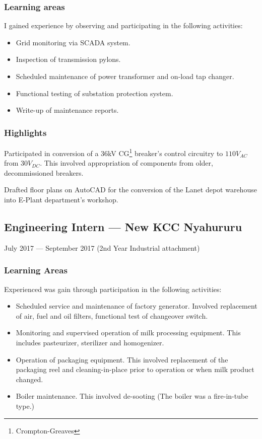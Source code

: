 \documentclass[a4paper]{article}
\begin{document}
\subsubsection{Learning areas}
I gained experience by observing and participating in the following activities:
\begin{itemize}
	\item Grid monitoring via SCADA system.
	\item Inspection of transmission pylons.
	\item Scheduled maintenance of power transformer and on-load tap changer.
	\item Functional testing of substation protection system.
	\item Write-up of maintenance reports.
\end{itemize}
\subsubsection{Highlights}
Participated in conversion of a 36kV CG\footnote{Crompton-Greaves} breaker's control circuitry to $110V_{AC}$ from $30V_{DC}$. This involved appropriation of components from older, decommissioned breakers.

Drafted floor plans on AutoCAD for the conversion of the Lanet depot warehouse into E-Plant department's workshop.

\subsection{Engineering Intern --- New KCC Nyahururu}
July 2017 --- September 2017 (2nd Year Industrial attachment)
\subsubsection{Learning Areas}
Experienced was gain through participation in the following activities:
\begin{itemize}
	\item Scheduled service and maintenance of factory generator. Involved replacement of air, fuel and oil filters, functional test of changeover switch.
	\item Monitoring and supervised operation of milk processing equipment. This includes pasteurizer, sterilizer and homogenizer.
	\item Operation of packaging equipment. This involved replacement of the packaging reel and cleaning-in-place prior to operation or when milk product changed.
	\item Boiler maintenance. This involved de-sooting (The boiler was a fire-in-tube type.)
\end{itemize}
\end{document}
